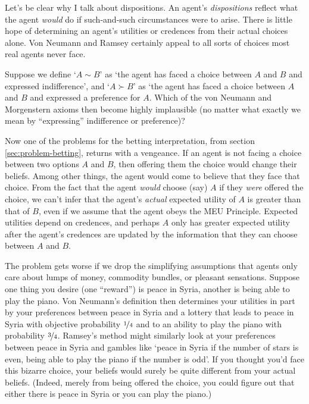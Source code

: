 Let's be clear why I talk about dispositions. An agent's \emph{dispositions}
reflect what the agent \emph{would} do if such-and-such circumstances were to
arise. There is little hope of determining an agent's utilities or credences
from their actual choices alone. Von Neumann and Ramsey certainly appeal to all
sorts of choices most real agents never face.

\begin{exercise}{2}
  Suppose we define `$A \sim B$' as `the agent has faced a choice between $A$
  and $B$ and expressed indifference', and `$A \succ B$' as `the agent has faced
  a choice between $A$ and $B$ and expressed a preference for $A$. Which of the
  von Neumann and Morgenstern axioms then become highly implausible (no matter
  what exactly we mean by ``expressing'' indifference or preference)?
\end{exercise}

Now one of the problems for the betting interpretation, from section
\ref{sec:problem-betting}, returns with a vengeance. If an agent is not facing a
choice between two options $A$ and $B$, then offering them the choice would
change their beliefs. Among other things, the agent would come to believe that they
face that choice. From the fact that the agent \emph{would} choose (say) $A$ if
they \emph{were} offered the choice, we can't infer that the agent's
\emph{actual} expected utility of $A$ is greater than that of $B$, even if we
assume that the agent obeys the MEU Principle. Expected utilities depend on
credences, and perhaps $A$ only has greater expected utility after the agent's
credences are updated by the information that they can choose between $A$ and
$B$.


The problem gets worse if we drop the simplifying assumptions that agents only
care about lumps of money, commodity bundles, or pleasant sensations. Suppose
one thing you desire (one ``reward'') is peace in Syria, another is being able
to play the piano. Von Neumann's definition then determines your utilities in
part by your preferences between peace in Syria and a lottery that leads to
peace in Syria with objective probability $\nicefrac{1}{4}$ and to an ability to
play the piano with probability $\nicefrac{3}{4}$. Ramsey's method might
similarly look at your preferences between peace in Syria and gambles like
`peace in Syria if the number of stars is even, being able to play the piano if
the number is odd'. If you thought you'd face this bizarre choice, your beliefs
would surely be quite different from your actual beliefs. (Indeed, merely from
being offered the choice, you could figure out that either there is peace
in Syria or you can play the piano.)

